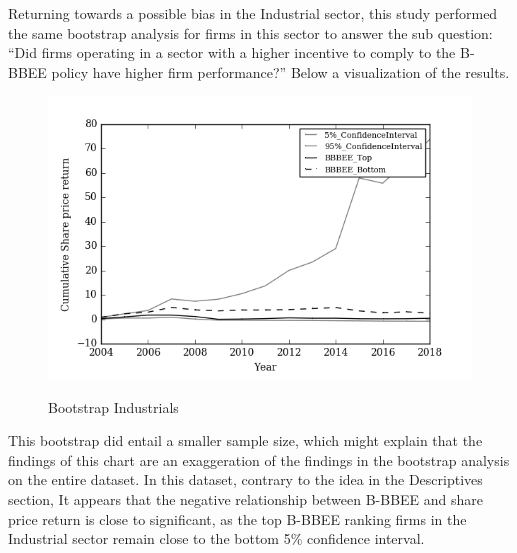 Returning towards a possible bias in the Industrial sector, this study performed the same bootstrap analysis for firms in this sector to answer the sub question: “Did firms operating in a sector with a higher incentive to comply to the B-BBEE policy have higher firm performance?” Below a visualization of the results.
\begin{figure}[!h]
  \centering
  \includegraphics [scale=1]{Images/Bootstrap_Industrials.png} \\
  {\small {\it \caption{Bootstrap Industrials \label{fig:moun} }}}
\end{figure}
This bootstrap did entail a smaller sample size, which might explain that the findings of this chart are an exaggeration of the findings in the bootstrap analysis on the entire dataset. In this dataset, contrary to the idea in the Descriptives section, It appears that the negative relationship between B-BBEE and share price return is close to significant, as the top B-BBEE ranking firms in the Industrial sector remain close to the bottom 5\% confidence interval.

